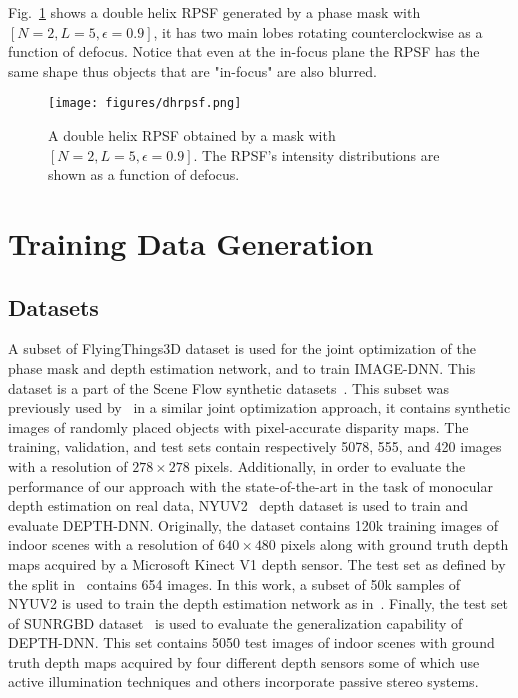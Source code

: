 \documentclass[preprint,5p,twocolumn]{elsarticle}
\begin{document}
Fig.~\ref{fig:dhrpsf} shows a double helix RPSF generated by a phase mask with $[N=2,L=5,\epsilon=0.9]$, it has two main lobes rotating counterclockwise as a function of defocus. Notice that even at the in-focus plane the RPSF has the same shape thus objects that are "in-focus" are also blurred.

\begin{figure}[h!]
    \centering
    \texttt{[image: figures/dhrpsf.png]}
    \caption{A double helix RPSF obtained by a mask with $[N=2,L=5,\epsilon=0.9]$. The RPSF's intensity distributions are shown as a function of defocus.}
    \label{fig:dhrpsf}
\end{figure}
 
\section{Training Data Generation}
\label{sec:data}
\subsection{Datasets}
A subset of FlyingThings3D dataset is used for the joint optimization of the phase mask and depth estimation network, and to train IMAGE-DNN. This dataset is a part of the Scene Flow synthetic datasets~\cite{MIFDB16}. This subset was previously used by~\cite{wu2019phasecam3d} in a similar joint optimization approach, it contains synthetic images of randomly placed objects with pixel-accurate disparity maps. The training, validation, and test sets contain respectively 5078, 555, and 420 images with a resolution of $278\times278$ pixels. Additionally, in order to evaluate the performance of our approach with the state-of-the-art in the task of monocular depth estimation on real data, NYUV2~\cite{eigen2014depth} depth dataset is used to train and evaluate DEPTH-DNN. Originally, the dataset contains 120k training images of indoor scenes with a resolution of $640\times480$ pixels along with ground truth depth maps acquired by a Microsoft Kinect V1 depth sensor. The test set as defined by the  split in~\cite{eigen2015predicting} contains 654 images. In this work, a subset of 50k samples of NYUV2 is used to train the depth estimation network as in~\cite{bhat2020adabins}. Finally, the test set of SUNRGBD dataset~\cite{song2015sun} is used to evaluate the generalization capability of DEPTH-DNN. This set contains 5050 test images of indoor scenes with ground truth depth maps acquired by four different depth sensors some of which use active illumination techniques and others incorporate passive stereo systems.
\end{document}

